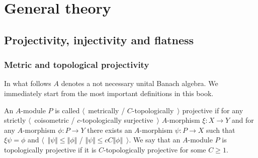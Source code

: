 
\chapter{General theory}\label{ChapterGeneralTheory} 



\section{
    Projectivity, injectivity and flatness}\label{SectionProjectivityInjectivityAndFlatness}



\subsection{
    Metric and topological projectivity}\label{SubSectionMetricAndTopologicalProjectivity}

In what follows $A$ denotes a not necessary unital Banach algebra. We
immediately start from the most important definitions in this book.

\begin{definition}\label{MetCTopProjMod} 
An $A$-module $P$ is 
called $\langle$~metrically / $C$-topologically~$\rangle$ projective if for any 
strictly $\langle$~coisometric / $c$-topologically surjective~$\rangle$
$A$-morphism $\xi:X\to Y$ and for any $A$-morphism $\phi:P\to Y$ 
there exists an $A$-morphism $\psi:P\to X$ such that $\xi\psi=\phi$  and
$\langle$~$\Vert\psi\Vert\leq\Vert\phi\Vert$ / 
$\Vert \psi\Vert\leq c C\Vert\phi\Vert$~$\rangle$. We say that an $A$-module 
$P$ is topologically projective if it is $C$-topologically projective for 
some $C\geq 1$.
\end{definition}

